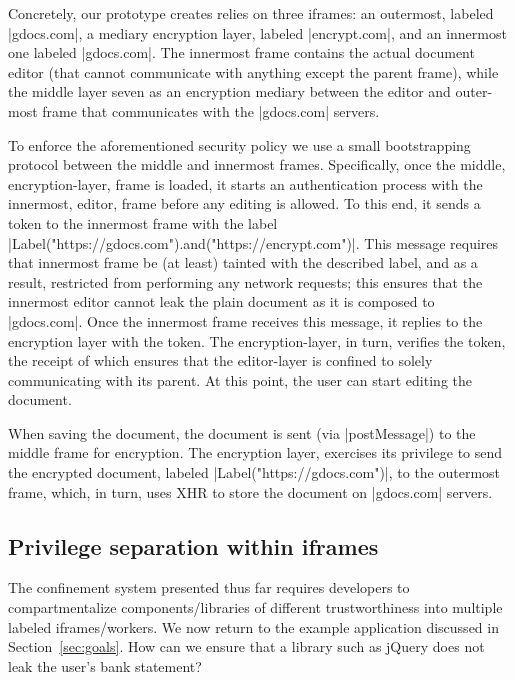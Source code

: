 Concretely, our prototype creates relies on three iframes: an outermost,
labeled \js|gdocs.com|, a mediary encryption layer, labeled
\js|encrypt.com|, and an innermost one labeled \js|gdocs.com|.
The innermost frame contains the actual document editor (that cannot
communicate with anything except the parent frame), while the middle
layer seven as an encryption mediary between the editor and outer-most
frame that communicates with the \js|gdocs.com| servers.

To enforce the aforementioned security policy we use a small
bootstrapping protocol between the middle and innermost frames.
Specifically,
once the middle, encryption-layer, frame is
loaded, it starts an authentication process with the innermost,
editor, frame before any
editing is allowed. To this end, it sends a token to the innermost
frame with the label \js|Label("https://gdocs.com").and("https://encrypt.com")|.
This message requires that innermost frame be (at least) tainted with
the described label, and as a result, restricted from performing any network
requests; this ensures that the innermost editor cannot leak
the plain document as it is composed to \js|gdocs.com|. Once the
innermost frame receives this
message, it replies to the encryption layer with the token.
The encryption-layer, in turn, verifies the token, the receipt of which ensures
that the editor-layer is confined to solely communicating with its
parent. At this point, the user
can start editing the document.

When saving the document, the document is
sent (via \js|postMessage|) to the middle frame for encryption.
The encryption layer, exercises its privilege  to
send the encrypted document, labeled \js|Label("https://gdocs.com")|,
to the outermost frame, which, in turn, uses XHR to store the
document on \js|gdocs.com| servers.


\subsection{Privilege separation within iframes}
\label{sec:system:script}

The confinement system presented thus far requires developers to
compartmentalize components/libraries of different trustworthiness into
multiple labeled iframes/workers.
%
%
We now return to the  example application discussed in
Section~\ref{sec:goals}. How can we ensure that a library such as
jQuery does not leak the user's bank statement?

